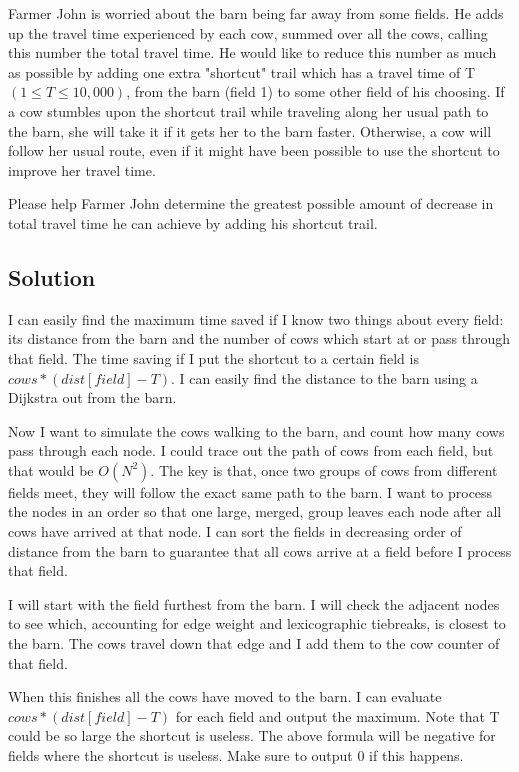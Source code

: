 \documentclass{article}
\begin{document}
Farmer John is worried about the barn being far away from some fields. He adds up the travel time experienced by each cow, summed over all the cows, calling this number the total travel time. He would like to reduce this number as much as possible by adding one extra "shortcut" trail which has a travel time of T $(1\leq T\leq 10,000)$, from the barn (field 1) to some other field of his choosing. If a cow stumbles upon the shortcut trail while traveling along her usual path to the barn, she will take it if it gets her to the barn faster. Otherwise, a cow will follow her usual route, even if it might have been possible to use the shortcut to improve her travel time.

Please help Farmer John determine the greatest possible amount of decrease in total travel time he can achieve by adding his shortcut trail.
\subsection{Solution}
I can easily find the maximum time saved if I know two things about every field: its distance from the barn and the number of cows which start at or pass through that field. The time saving if I put the shortcut to a certain field is $cows*(dist[field]-T)$. I can easily find the distance to the barn using a Dijkstra out from the barn.

Now I want to simulate the cows walking to the barn, and count how many cows pass through each node. I could trace out the path of cows from each field, but that would be $O(N^2)$. The key is that, once two groups of cows from different fields meet, they will follow the exact same path to the barn. I want to process the nodes in an order so that one large, merged, group leaves each node after all cows have arrived at that node. I can sort the fields in decreasing order of distance from the barn to guarantee that all cows arrive at a field before I process that field.

I will start with the field furthest from the barn. I will check the adjacent nodes to see which, accounting for edge weight and lexicographic tiebreaks, is closest to the barn. The cows travel down that edge and I add them to the cow counter of that field.

When this finishes all the cows have moved to the barn. I can evaluate $cows*(dist[field]-T)$ for each field and output the maximum. Note that T could be so large the shortcut is useless. The above formula will be negative for fields where the shortcut is useless. Make sure to output 0 if this happens.
\end{document}
